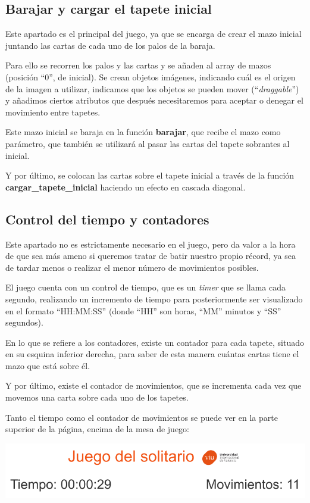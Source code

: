 \documentclass{\ClassPath/viu-tfm-template}
\begin{document}
\subsection{Barajar y cargar el tapete inicial}
Este apartado es el principal del juego, ya que se encarga de crear el mazo inicial  juntando las cartas de cada uno de los palos de la baraja.

Para ello se recorren los palos y las cartas y se añaden al array de mazos (posición “0”, de inicial). Se crean objetos imágenes, indicando cuál es el origen de la imagen a utilizar, indicamos que los objetos se pueden mover (“\textit{draggable}”) y añadimos ciertos atributos que después necesitaremos para aceptar o denegar el movimiento entre tapetes.

Este mazo inicial se baraja en la función \textbf{barajar}, que recibe el mazo como parámetro, que también se utilizará al pasar las cartas del tapete sobrantes al inicial.

Y por último, se colocan las cartas sobre el tapete inicial a través de la función \textbf{cargar\_tapete\_inicial} haciendo un efecto en cascada diagonal.


\subsection{Control del tiempo y contadores}
Este apartado no es estrictamente necesario en el juego, pero da valor a la hora de que sea más ameno si queremos tratar de batir nuestro propio récord, ya sea de tardar menos o realizar el menor número de movimientos posibles.

El juego cuenta con un control de tiempo, que es un \textit{timer} que se llama cada segundo, realizando un incremento de tiempo para posteriormente ser visualizado en el formato “HH:MM:SS” (donde “HH” son horas, “MM” minutos y “SS” segundos).

En lo que se refiere a los contadores, existe un contador para cada tapete, situado en su esquina inferior derecha, para saber de esta manera cuántas cartas tiene el mazo que está sobre él.

Y por último, existe el contador de movimientos, que se incrementa cada vez que movemos una carta sobre cada uno de los tapetes.

Tanto el tiempo como el contador de movimientos se puede ver en la parte superior de la página, encima de la mesa de juego:

\vspace{-1em}
\begin{center}
    \includegraphics[frame,width=0.8\linewidth]{img/cabecera.png}
\end{center}
\vspace{-1em}
\end{document}
